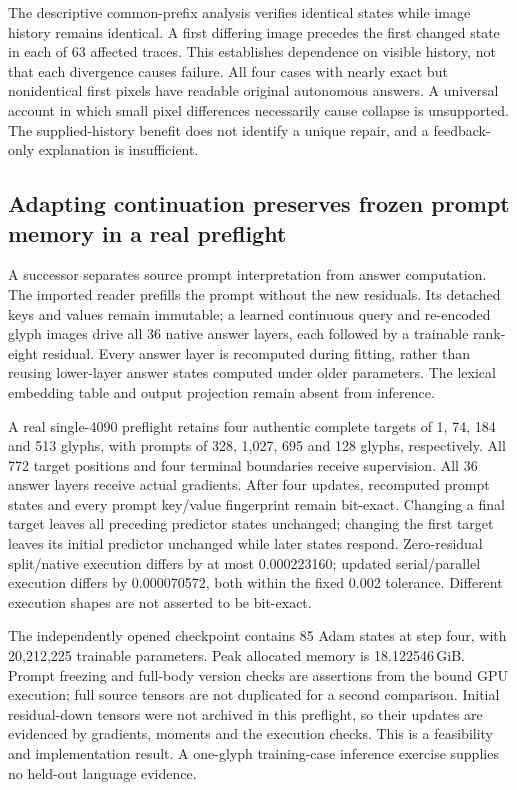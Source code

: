 The descriptive common-prefix analysis verifies identical states while image
history remains identical. A first differing image precedes the first changed
state in each of 63 affected traces. This establishes dependence on visible
history, not that each divergence causes failure. All four cases with nearly
exact but nonidentical first pixels have readable original autonomous answers.
A universal account in which small pixel differences necessarily cause
collapse is unsupported. The supplied-history benefit does not identify a
unique repair, and a feedback-only explanation is insufficient.

\subsection*{Adapting continuation preserves frozen prompt memory in a real preflight}
A successor separates source prompt interpretation from answer computation.
The imported reader prefills the prompt without the new residuals. Its detached
keys and values remain immutable; a learned continuous query and re-encoded
glyph images drive all 36 native answer layers, each followed by a trainable
rank-eight residual. Every answer layer is recomputed during fitting, rather
than reusing lower-layer answer states computed under older parameters.
The lexical embedding table and output projection remain absent from inference.

A real single-4090 preflight retains four authentic complete targets of 1, 74,
184 and 513 glyphs, with prompts of 328, 1,027, 695 and 128 glyphs, respectively.
All 772 target positions and four terminal boundaries receive supervision.
All 36 answer layers receive actual gradients. After four updates, recomputed
prompt states and every prompt key/value fingerprint remain bit-exact.
Changing a final target leaves all preceding predictor states unchanged;
changing the first target leaves its initial predictor unchanged while later
states respond. Zero-residual split/native execution differs by at most
0.000223160; updated serial/parallel execution differs by 0.000070572, both
within the fixed 0.002 tolerance. Different execution shapes are not asserted
to be bit-exact.

The independently opened checkpoint contains 85 Adam states at step four,
with 20,212,225 trainable parameters. Peak allocated memory is
18.122546\,GiB. Prompt freezing and full-body version checks are assertions
from the bound GPU execution; full source tensors are not duplicated for a
second comparison. Initial residual-down tensors were not archived in this
preflight, so their updates are evidenced by gradients, moments and the
execution checks. This is a feasibility and implementation result. A one-glyph
training-case inference exercise supplies no held-out language evidence.

